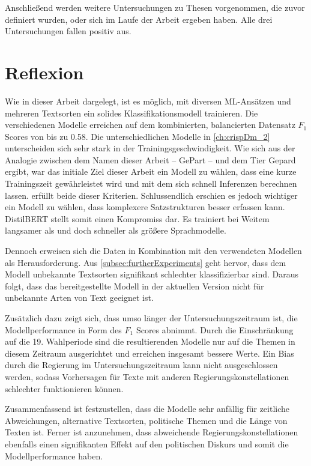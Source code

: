 Anschließend werden weitere Untersuchungen zu Thesen vorgenommen, die zuvor definiert wurden, oder sich im Laufe der Arbeit ergeben haben. Alle drei Untersuchungen fallen positiv aus.

\section{Reflexion}

Wie in dieser Arbeit dargelegt, ist es möglich, mit diversen \ac{ML}-Ansätzen und mehreren Textsorten ein solides Klassifikationsmodell trainieren. Die verschiedenen Modelle erreichen auf dem kombinierten, balancierten Datensatz \(F_1\) Scores von bis zu \num{0.58}. Die unterschiedlichen Modelle in \autoref{ch:crispDm_2}  unterscheiden sich sehr stark in der Trainingsgeschwindigkeit. Wie sich aus der Analogie zwischen dem Namen dieser Arbeit -- GePart -- und dem Tier Gepard ergibt, war das initiale Ziel dieser Arbeit ein Modell zu wählen, dass eine kurze Trainingszeit gewährleistet wird und mit dem sich schnell Inferenzen berechnen lassen. \ft erfüllt beide dieser Kriterien. Schlussendlich erschien es jedoch wichtiger ein Modell zu wählen, dass komplexere Satzstrukturen besser erfassen kann. DistilBERT stellt somit einen Kompromiss dar. Es trainiert bei Weitem langsamer als \ft und doch schneller als größere Sprachmodelle.

Dennoch erweisen sich die Daten in Kombination mit den verwendeten Modellen als Herausforderung. Aus \autoref{subsec:furtherExperiments} geht hervor, dass dem Modell unbekannte Textsorten signifikant schlechter klassifizierbar sind. Daraus folgt, dass das bereitgestellte Modell in der aktuellen Version nicht für unbekannte Arten von Text geeignet ist.


Zusätzlich dazu zeigt sich, dass umso länger der Untersuchungszeitraum ist, die Modellperformance in Form des \(F_1\) Scores abnimmt. Durch die Einschränkung auf die \num{19}. Wahlperiode sind die resultierenden Modelle nur auf die Themen in diesem Zeitraum ausgerichtet und erreichen insgesamt bessere Werte. Ein Bias durch die Regierung im Untersuchungszeitraum kann nicht ausgeschlossen werden, sodass Vorhersagen für Texte mit anderen Regierungskonstellationen schlechter funktionieren können. 

Zusammenfassend ist festzustellen, dass die Modelle sehr anfällig für zeitliche Abweichungen, alternative Textsorten, politische Themen und die Länge von Texten ist. Ferner ist anzunehmen, dass abweichende Regierungskonstellationen ebenfalls einen signifikanten Effekt auf den politischen Diskurs und somit die Modellperformance haben.

